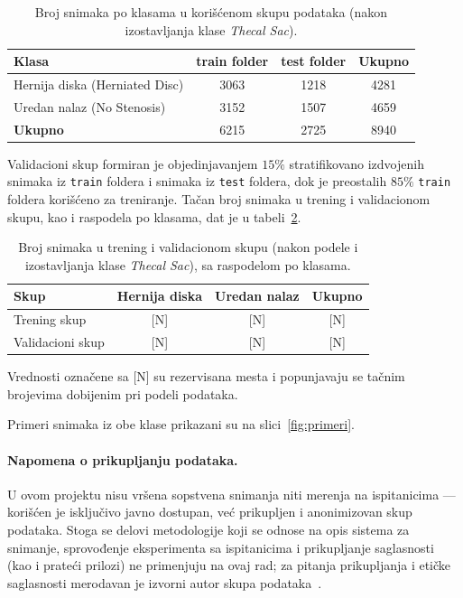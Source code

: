 \documentclass[12pt,a4paper]{article}
\begin{document}
\begin{table}[H]
\centering
\caption{Broj snimaka po klasama u korišćenom skupu podataka (nakon izostavljanja klase
\textit{Thecal Sac}).}
\label{tab:baza}
\begin{tabular}{lccc}
\toprule
\textbf{Klasa} & \textbf{train folder} & \textbf{test folder} & \textbf{Ukupno} \\
\midrule
Hernija diska (Herniated Disc) & 3063 & 1218 & 4281 \\
Uredan nalaz (No Stenosis)     & 3152 & 1507 & 4659 \\
\midrule
\textbf{Ukupno}                & 6215 & 2725 & 8940 \\
\bottomrule
\end{tabular}
\end{table}

Validacioni skup formiran je objedinjavanjem $15\%$ stratifikovano izdvojenih snimaka iz
\texttt{train} foldera i snimaka iz \texttt{test} foldera, dok je preostalih $85\%$
\texttt{train} foldera korišćeno za treniranje. Tačan broj snimaka u trening i
validacionom skupu, kao i raspodela po klasama, dat je u tabeli~\ref{tab:split}.

\begin{table}[H]
\centering
\caption{Broj snimaka u trening i validacionom skupu (nakon podele i izostavljanja klase
\textit{Thecal Sac}), sa raspodelom po klasama.}
\label{tab:split}
\begin{tabular}{lccc}
\toprule
\textbf{Skup} & \textbf{Hernija diska} & \textbf{Uredan nalaz} & \textbf{Ukupno} \\
\midrule
Trening skup     & [N] & [N] & [N] \\
Validacioni skup & [N] & [N] & [N] \\
\bottomrule
\end{tabular}

\vspace{2pt}
{\footnotesize Vrednosti označene sa [N] su rezervisana mesta i popunjavaju se tačnim
brojevima dobijenim pri podeli podataka.}
\end{table}

Primeri snimaka iz obe klase prikazani su na slici~\ref{fig:primeri}.

\paragraph{Napomena o prikupljanju podataka.}
U ovom projektu nisu vršena sopstvena snimanja niti merenja na ispitanicima --- korišćen
je isključivo javno dostupan, već prikupljen i anonimizovan skup podataka. Stoga se delovi
metodologije koji se odnose na opis sistema za snimanje, sprovođenje eksperimenta sa
ispitanicima i prikupljanje saglasnosti (kao i prateći prilozi) ne primenjuju na ovaj rad;
za pitanja prikupljanja i etičke saglasnosti merodavan je izvorni autor skupa
podataka~\cite{khan2023dataset}.
\end{document}
